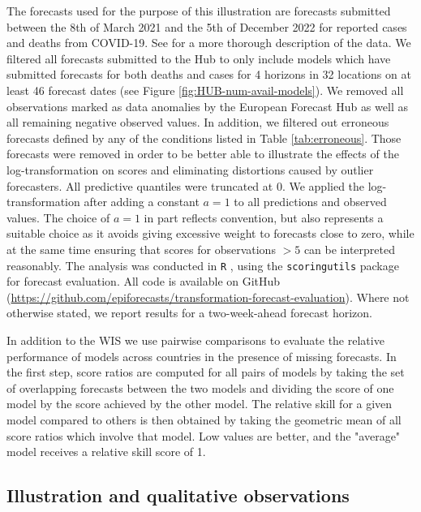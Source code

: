 \documentclass{article}
\begin{document}
The forecasts used for the purpose of this illustration are forecasts submitted between the 8th of March 2021 and the 5th of December 2022 for reported cases and deaths from COVID-19. See \cite{sherrattPredictivePerformanceMultimodel2022} for a more thorough description of the data. We filtered all forecasts submitted to the Hub to only include models which have submitted forecasts for both deaths and cases for 4 horizons in 32 locations on at least 46 forecast dates (see Figure \ref{fig:HUB-num-avail-models}). We removed all observations marked as data anomalies by the European Forecast Hub \citep{sherrattPredictivePerformanceMultimodel2022} as well as all remaining negative observed values. In addition, we filtered out erroneous forecasts defined by any of the conditions listed in Table \ref{tab:erroneous}. Those forecasts were removed in order to be better able to illustrate the effects of the log-transformation on scores and eliminating distortions caused by outlier forecasters. All predictive quantiles were truncated at 0. We applied the log-transformation after adding a constant $a = 1$ to all predictions and observed values. The choice of $a = 1$ in part reflects convention, but also represents a suitable choice as it avoids giving excessive weight to forecasts close to zero, while at the same time ensuring that scores for observations $> 5$ can be interpreted reasonably. The analysis was conducted in \texttt{R} \citep{R}, using the \texttt{scoringutils} package \citep{bosseEvaluatingForecastsScoringutils2022} for forecast evaluation. All code is available on GitHub 
(\url{https://github.com/epiforecasts/transformation-forecast-evaluation}). Where not otherwise stated, we report results for a two-week-ahead forecast horizon. 

In addition to the WIS we use pairwise comparisons \citep{cramerEvaluationIndividualEnsemble2021} to evaluate the relative performance of models across countries in the presence of missing forecasts. In the first step, score ratios are computed for all pairs of models by taking the set of overlapping forecasts between the two models and dividing the score of one model by the score achieved by the other model. The relative skill for a given model compared to others is then obtained by taking the geometric mean of all score ratios which involve that model. Low values are better, and the "average" model receives a relative skill score of 1. 





\subsection{Illustration and qualitative observations}
\end{document}
